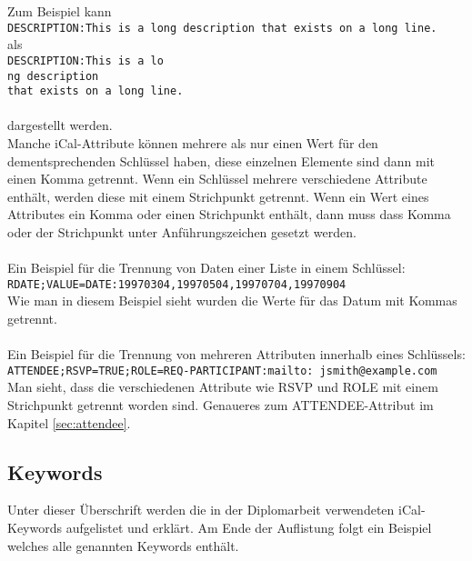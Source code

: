 Zum Beispiel kann\vspace*{2mm}\\
\texttt{DESCRIPTION:This is a long description that exists on a long line.}\vspace*{2mm}\\als\vspace*{2mm}\\
\texttt{DESCRIPTION:This is a lo\\ 
 ng description\\  
  that exists on a long line.}\\\\
dargestellt werden.\vspace*{2mm}\\
Manche iCal-Attribute können mehrere als nur einen Wert für den dementsprechenden Schlüssel haben, diese einzelnen Elemente sind dann mit einen Komma getrennt. Wenn ein Schlüssel mehrere verschiedene Attribute enthält, werden diese mit einem Strichpunkt getrennt. Wenn ein Wert eines Attributes ein Komma oder einen Strichpunkt enthält, dann muss dass Komma oder der Strichpunkt unter Anführungszeichen gesetzt werden.\\\\
Ein Beispiel für die Trennung von Daten einer Liste in einem Schlüssel:\vspace*{2mm}\\
\texttt{RDATE;VALUE=DATE:19970304,19970504,19970704,19970904}\vspace*{2mm}\\
Wie man in diesem Beispiel sieht wurden die Werte für das Datum mit Kommas getrennt.\\\\
Ein Beispiel für die Trennung von mehreren Attributen innerhalb eines Schlüssels:\vspace*{2mm}\\
\texttt{ATTENDEE;RSVP=TRUE;ROLE=REQ-PARTICIPANT:mailto:
jsmith@example.com}\vspace*{2mm}\\Man sieht, dass die verschiedenen Attribute wie RSVP und ROLE mit einem Strichpunkt getrennt worden sind. Genaueres zum ATTENDEE-Attribut im Kapitel \ref{sec:attendee}. 
\\\textcite{iCalDocumentation} 

\pagebreak
\renewcommand{\theauthor}{Dario Wagner}
\subsection{Keywords}
\label{sec:keywords}
Unter dieser Überschrift werden die in der Diplomarbeit verwendeten iCal-Keywords aufgelistet und erklärt. Am Ende der Auflistung folgt ein Beispiel welches alle genannten Keywords enthält. 
